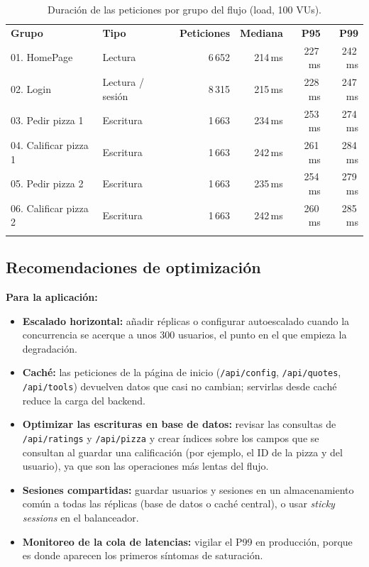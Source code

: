 \documentclass[11pt]{article}
\newcommand{\encab}[1]{{\leavevmode\color{white}\sffamily\bfseries #1}}
\renewcommand{\toprule}{\arrayrulecolor{ucbazul}\specialrule{0.8pt}{0pt}{0pt}\arrayrulecolor{black}}
\renewcommand{\midrule}{\arrayrulecolor{ucbazul}\specialrule{0.4pt}{0pt}{0pt}\arrayrulecolor{black}}
\renewcommand{\bottomrule}{\arrayrulecolor{acento}\specialrule{1.2pt}{0pt}{0pt}\arrayrulecolor{black}}
\begin{document}
\begin{table}[H]
\centering
\caption{Duración de las peticiones por grupo del flujo (load, 100 VUs).}
\label{tab:grupos}
\begin{tabularx}{\textwidth}{X l r r r r}
\toprule
\rowcolor{ucbazul}
\encab{Grupo} & \encab{Tipo} & \encab{Peticiones} & \encab{Mediana} & \encab{P95} & \encab{P99} \\
\midrule
01. HomePage          & Lectura   & 6\,652 & 214\,ms & 227\,ms & 242\,ms \\
02. Login             & Lectura / sesión & 8\,315 & 215\,ms & 228\,ms & 247\,ms \\
03. Pedir pizza 1     & Escritura & 1\,663 & 234\,ms & 253\,ms & 274\,ms \\
04. Calificar pizza 1 & Escritura & 1\,663 & 242\,ms & 261\,ms & 284\,ms \\
05. Pedir pizza 2     & Escritura & 1\,663 & 235\,ms & 254\,ms & 279\,ms \\
06. Calificar pizza 2 & Escritura & 1\,663 & 242\,ms & 260\,ms & 285\,ms \\
\bottomrule
\end{tabularx}
\end{table}

\subsection{Recomendaciones de optimización}

\textbf{Para la aplicación:}
\begin{itemize}
  \item \textbf{Escalado horizontal:} añadir réplicas o configurar autoescalado
        cuando la concurrencia se acerque a unos 300 usuarios, el punto en el que
        empieza la degradación.
  \item \textbf{Caché:} las peticiones de la página de inicio
        (\texttt{/api/config}, \texttt{/api/quotes}, \texttt{/api/tools}) devuelven
        datos que casi no cambian; servirlas desde caché reduce la carga del backend.
  \item \textbf{Optimizar las escrituras en base de datos:} revisar las consultas de
        \texttt{/api/ratings} y \texttt{/api/pizza} y crear índices sobre los campos
        que se consultan al guardar una calificación (por ejemplo, el ID de la pizza
        y del usuario), ya que son las operaciones más lentas del flujo.
  \item \textbf{Sesiones compartidas:} guardar usuarios y sesiones en un
        almacenamiento común a todas las réplicas (base de datos o caché central), o
        usar \emph{sticky sessions} en el balanceador.
  \item \textbf{Monitoreo de la cola de latencias:} vigilar el P99 en producción,
        porque es donde aparecen los primeros síntomas de saturación.
\end{itemize}
\end{document}

